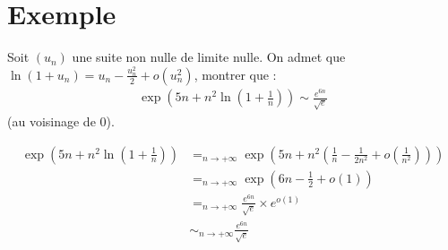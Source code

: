 \documentclass[../main.tex]{subfiles}
\begin{document}
\section{Exemple}
\begin{tcolorbox}[title=Exemple 24.46, title filled=false, colframe=darkgreen, colback=darkgreen!10!white]
    Soit $(u_n)$ une suite non nulle de limite nulle. On admet que $\ln (1 + u_n) = u_n - \frac{u_n^2}{2} + o(u_n^2)$, montrer que : 
    \begin{align*}
        \exp \left(5n + n^2\ln \left(1 + \frac{1}{n}\right)\right) \sim \frac{e^{6n}}{\sqrt{e}}
    \end{align*}
    (au voisinage de $0$).
\end{tcolorbox}

\begin{align*}
    \exp \left(5n + n^2 \ln \left(1 + \frac{1}{n}\right)\right) &=_{n\to +\infty} \exp \left(5n + n^2 \left(\frac{1}{n} - \frac{1}{2n^2} + o\left(\frac{1}{n^2}\right)\right)\right) \\
    &=_{n\to +\infty} \exp \left(6n - \frac{1}{2} + o(1)\right) \\
    &=_{n\to +\infty} \frac{e^{6n}}{\sqrt{e}} \times e^{o(1)} \\
    &\sim_{n\to +\infty} \frac{e^{6n}}{\sqrt{e}}
\end{align*}
\end{document}
